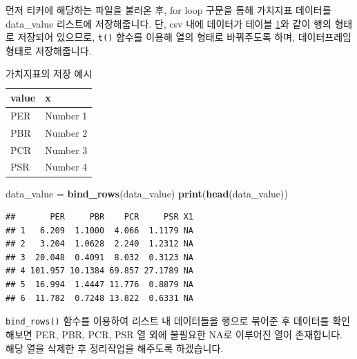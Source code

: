 \documentclass[12pt,]{book}
\newenvironment{Shaded}{\begin{snugshade}}{\end{snugshade}}
\newcommand{\KeywordTok}[1]{\textcolor[rgb]{0.13,0.29,0.53}{\textbf{#1}}}
\newcommand{\NormalTok}[1]{#1}
\newcommand{\OperatorTok}[1]{\textcolor[rgb]{0.81,0.36,0.00}{\textbf{#1}}}
\newcommand{\StringTok}[1]{\textcolor[rgb]{0.31,0.60,0.02}{#1}}
\begin{document}
먼저 티커에 해당하는 파일을 불러온 후, for loop 구문을 통해 가치지표 데이터를 data\_value 리스트에 저장해줍니다. 단, csv 내에 데이터가 테이블 \ref{tab:valuesample}와 같이 행의 형태로 저장되어 있으므로, \texttt{t()} 함수를 이용해 열의 형태로 바꿔주도록 하며, 데이터프레임 형태로 저장해줍니다.

\begin{table}[!h]

\caption{\label{tab:valuesample}가치지표의 저장 예시}
\centering
\begin{tabular}{>{\centering\arraybackslash}p{3cm}>{\centering\arraybackslash}p{5cm}}
\toprule
value & x\\
\midrule
\rowcolor{gray!6}  PER & Number 1\\
PBR & Number 2\\
\rowcolor{gray!6}  PCR & Number 3\\
PSR & Number 4\\
\bottomrule
\end{tabular}
\end{table}

\begin{Shaded}
\begin{Highlighting}[]
\NormalTok{data_value =}\StringTok{ }\KeywordTok{bind_rows}\NormalTok{(data_value)}
\KeywordTok{print}\NormalTok{(}\KeywordTok{head}\NormalTok{(data_value))}
\end{Highlighting}
\end{Shaded}

\begin{verbatim}
##       PER     PBR    PCR     PSR X1
## 1   6.209  1.1000  4.066  1.1179 NA
## 2   3.204  1.0628  2.240  1.2312 NA
## 3  20.048  0.4091  8.032  0.3123 NA
## 4 101.957 10.1384 69.857 27.1789 NA
## 5  16.994  1.4447 11.776  0.8879 NA
## 6  11.782  0.7248 13.822  0.6331 NA
\end{verbatim}

\texttt{bind\_rows()} 함수를 이용하여 리스트 내 데이터들을 행으로 묶어준 후 데이터를 확인해보면 PER, PBR, PCR, PSR 열 외에 불필요한 NA로 이루어진 열이 존재합니다. 해당 열을 삭제한 후 정리작업을 해주도록 하겠습니다.

\begin{Shaded}
\end{Shaded}
\end{document}

